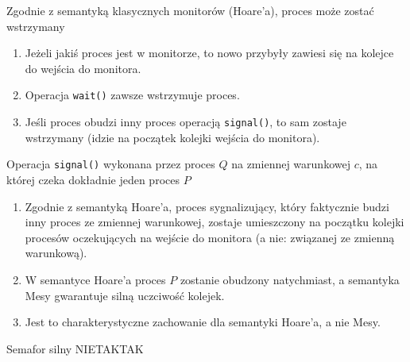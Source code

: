 \begin{solutions}
    \sol Zgodnie z semantyką klasycznych monitorów (Hoare'a), proces może zostać wstrzymany

    \begin{enumerate}[\bf A.]
        \item Jeżeli jakiś proces jest w monitorze, to nowo przybyły zawiesi się na kolejce do wejścia do monitora.

        \item Operacja \texttt{wait()} zawsze wstrzymuje proces.

        \item Jeśli proces obudzi inny proces operacją \texttt{signal()}, to sam zostaje wstrzymany (idzie na początek kolejki wejścia do monitora).
    \end{enumerate}

    \sol Operacja \texttt{signal()} wykonana przez proces $Q$ na zmiennej warunkowej $c$, na której czeka dokładnie jeden proces $P$

    \begin{enumerate}[\bf A.]
        \item Zgodnie z semantyką Hoare'a, proces sygnalizujący, który faktycznie budzi inny proces ze zmiennej warunkowej, zostaje umieszczony na początku kolejki procesów oczekujących na wejście do monitora (a nie: związanej ze zmienną warunkową).

        \item W semantyce Hoare'a proces $P$ zostanie obudzony natychmiast, a semantyka Mesy gwarantuje silną uczciwość kolejek.

        \item Jest to charakterystyczne zachowanie dla semantyki Hoare'a, a nie Mesy.
    \end{enumerate}

    \sol Semafor silny
    {NIE}{TAK}{TAK}


\end{solutions}
